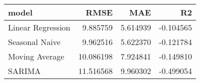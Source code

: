 \begin{tabular}{lrrr}
\toprule
model & RMSE & MAE & R2 \\
\midrule
Linear Regression & 9.885759 & 5.614939 & -0.104565 \\
Seasonal Naive & 9.962516 & 5.622370 & -0.121784 \\
Moving Average & 10.086198 & 7.924841 & -0.149810 \\
SARIMA & 11.516568 & 9.960302 & -0.499054 \\
\bottomrule
\end{tabular}
